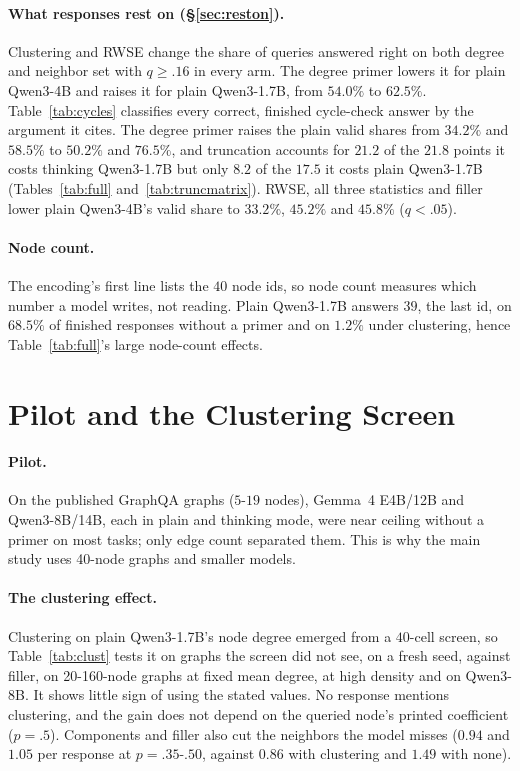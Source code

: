 \documentclass[11pt]{article}
\begin{document}
\paragraph{What responses rest on (\S\ref{sec:reston}).} Clustering and RWSE change the share of queries answered right on both degree and neighbor set with $q\geq.16$ in every arm. The degree primer lowers it for plain Qwen3-4B and raises it for plain Qwen3-1.7B, from $54.0\%$ to $62.5\%$. %
Table~\ref{tab:cycles} classifies every correct, finished cycle-check answer by the argument it cites. The degree primer raises the plain valid shares from $34.2\%$ and $58.5\%$ to $50.2\%$ and $76.5\%$, and truncation accounts for $21.2$ of the $21.8$ points it costs thinking Qwen3-1.7B but only $8.2$ of the $17.5$ it costs plain Qwen3-1.7B (Tables~\ref{tab:full} and~\ref{tab:truncmatrix}). RWSE, all three statistics and filler lower plain Qwen3-4B's valid share to $33.2\%$, $45.2\%$ and $45.8\%$ ($q<.05$). %

\paragraph{Node count.} The encoding's first line lists the $40$ node ids, so node count measures which number a model writes, not reading. Plain Qwen3-1.7B answers $39$, the last id, on $68.5\%$ of finished responses without a primer and on $1.2\%$ under clustering, hence Table~\ref{tab:full}'s large node-count effects. %

\section{Pilot and the Clustering Screen}
\label{app:pilot}
\paragraph{Pilot.} On the published GraphQA graphs ($5$-$19$ nodes), Gemma~4 E4B/12B and Qwen3-8B/14B, each in plain and thinking mode, were near ceiling without a primer on most tasks; only edge count separated them. This is why the main study uses 40-node graphs and smaller models.

\paragraph{The clustering effect.} Clustering on plain Qwen3-1.7B's node degree emerged from a $40$-cell screen, so Table~\ref{tab:clust} tests it on graphs the screen did not see, on a fresh seed, against filler, on 20-160-node graphs at fixed mean degree, at high density and on Qwen3-8B. It shows little sign of using the stated values. No response mentions clustering, and the gain does not depend on the queried node's printed coefficient ($p=.5$). Components and filler also cut the neighbors the model misses ($0.94$ and $1.05$ per response at $p=.35$-$.50$, against $0.86$ with clustering and $1.49$ with none). %
\end{document}
